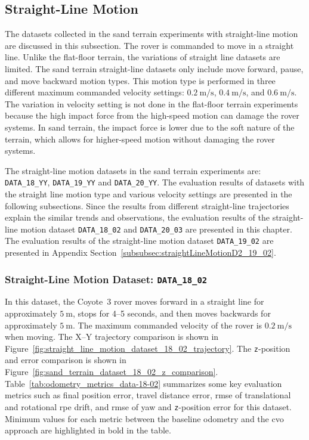 \documentclass[report.tex]{subfiles}
\begin{document}
    \subsection{Straight-Line Motion}
    
    The datasets collected in the sand terrain experiments with straight-line motion are discussed in this subsection. The rover is commanded to move in a straight line. Unlike the flat-floor terrain, the variations of straight line datasets are limited. The sand terrain straight-line datasets only include move forward, pause, and move backward motion types. This motion type is performed in three different maximum commanded velocity settings: $0.2~\mathrm{m/s}$, $0.4~\mathrm{m/s}$, and $0.6~\mathrm{m/s}$. The variation in velocity setting is not done in the flat-floor terrain experiments because the high impact force from the high-speed motion can damage the rover systems. In sand terrain, the impact force is lower due to the soft nature of the terrain, which allows for higher-speed motion without damaging the rover systems.
    
    The straight-line motion datasets in the sand terrain experiments are: \texttt{DATA\_18\_YY}, \texttt{DATA\_19\_YY} and \texttt{DATA\_20\_YY}. The evaluation results of datasets with the straight line motion type and various velocity settings are presented in the following subsections. Since the results from different straight-line trajectories explain the similar trends and observations, the evaluation results of the straight-line motion dataset \texttt{DATA\_18\_02} and \texttt{DATA\_20\_03} are presented in this chapter. The evaluation results of the straight-line motion dataset \texttt{DATA\_19\_02} are presented in Appendix Section~\ref{subsubsec:straightLineMotionD2_19_02}.
    
    
    \subsubsection{Straight-Line Motion Dataset: \texttt{DATA\_18\_02}} \label{subsubsec:straightLineMotionD1_18_02}
        
    In this dataset, the Coyote~3 rover moves forward in a straight line for approximately $5~\mathrm{m}$, stops for 4--5 seconds, and then moves backwards for approximately $5~\mathrm{m}$. The maximum commanded velocity of the rover is $0.2~\mathrm{m/s}$ when moving. The X--Y trajectory comparison is shown in Figure~\ref{fig:straight_line_motion_dataset_18_02_trajectory}. The \texttt{z}-position and error comparison is shown in Figure~\ref{fig:sand_terrain_dataset_18_02_z_comparison}. Table~\ref{tab:odometry_metrics_data-18-02} summarizes some key evaluation metrics such as final position error, travel distance error, \gls{rmse} of translational and rotational \gls{rpe} drift, and \gls{rmse} of yaw and \texttt{z}-position error for this dataset. Minimum values for each metric between the baseline odometry and the \gls{cvo} approach are highlighted in bold in the table. 
    
\end{document}
